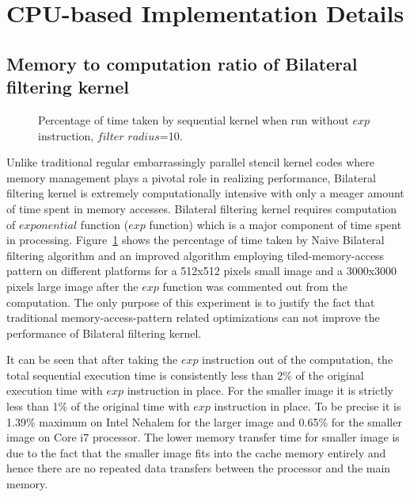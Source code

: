 \documentclass{IEEEtran}
\begin{document}
\section{CPU-based Implementation Details}
\label{sec:optimizations} 

\subsection{Memory to computation ratio of Bilateral filtering kernel}
\begin{figure}[h!]
\begin{centering}
\par\end{centering}
\caption{Percentage of time taken by sequential kernel when run without $exp$ instruction, $filter$ $radius$=10.}
\label{fig:noexp} 
\end{figure}

Unlike traditional regular embarrassingly parallel stencil kernel codes where memory management plays a pivotal role in realizing performance, Bilateral filtering kernel is extremely computationally intensive with only a meager amount of time spent in memory accesses. Bilateral filtering kernel requires computation of $exponential$ function ($exp$ function) which is a major component of time spent in processing. Figure~\ref{fig:noexp} shows the percentage of time taken by Naive Bilateral filtering algorithm\cite{Tomasi1998} and an improved algorithm employing tiled-memory-access pattern on different platforms for a 512x512 pixels small image and a 3000x3000 pixels large image after the $exp$ function was commented out from the computation. The only purpose of this experiment is to justify the fact that traditional memory-access-pattern related optimizations can not improve the performance of Bilateral filtering kernel.

It can be seen that after taking the $exp$ instruction out of the computation, the total sequential execution time is consistently less than 2\% of the original execution time with $exp$ instruction in place. For the smaller image it is strictly less than 1\% of the original time with $exp$ instruction in place. To be precise it is 1.39\% maximum on Intel Nehalem for the larger image and 0.65\% for the smaller image on Core i7 processor. The lower memory transfer time for smaller image is due to the fact that the smaller image fits into the cache memory entirely and hence there are no repeated data transfers between the processor and the main memory.
\end{document}
